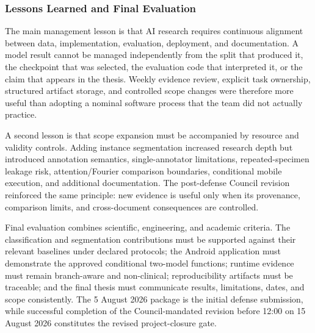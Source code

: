 \documentclass[12pt,a4paper]{report}
\newenvironment{revisionblock}{\begin{snugshade}\noindent}{\end{snugshade}}
\begin{document}
\subsubsection{\texorpdfstring{\colorbox{RevisionYellow}{Lessons Learned and Final Evaluation}}{Lessons Learned and Final Evaluation}}
\begin{revisionblock}
The main management lesson is that AI research requires continuous alignment between data, implementation, evaluation, deployment, and documentation. A model result cannot be managed independently from the split that produced it, the checkpoint that was selected, the evaluation code that interpreted it, or the claim that appears in the thesis. Weekly evidence review, explicit task ownership, structured artifact storage, and controlled scope changes were therefore more useful than adopting a nominal software process that the team did not actually practice.
\end{revisionblock}
\begin{revisionblock}
A second lesson is that scope expansion must be accompanied by resource and validity controls. Adding instance segmentation increased research depth but introduced annotation semantics, single-annotator limitations, repeated-specimen leakage risk, attention/Fourier comparison boundaries, conditional mobile execution, and additional documentation. The post-defense Council revision reinforced the same principle: new evidence is useful only when its provenance, comparison limits, and cross-document consequences are controlled.
\end{revisionblock}
\begin{revisionblock}
Final evaluation combines scientific, engineering, and academic criteria. The classification and segmentation contributions must be supported against their relevant baselines under declared protocols; the Android application must demonstrate the approved conditional two-model functions; runtime evidence must remain branch-aware and non-clinical; reproducibility artifacts must be traceable; and the final thesis must communicate results, limitations, dates, and scope consistently. The 5 August 2026 package is the initial defense submission, while successful completion of the Council-mandated revision before 12:00 on 15 August 2026 constitutes the revised project-closure gate.
\end{revisionblock}
\end{document}
